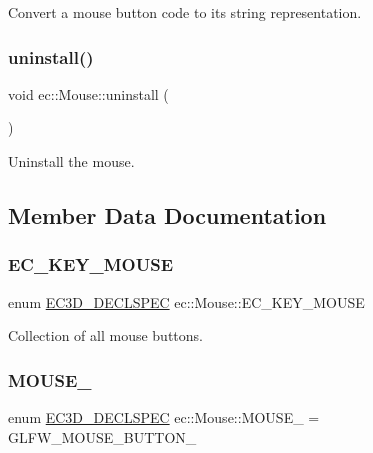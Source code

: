 Convert a mouse button code to its string representation. 

\mbox{\label{classec_1_1_mouse_afee0caa17130a35f9b94523776a6fffb}} 
\subsubsection{\texorpdfstring{uninstall()}{uninstall()}}
{\footnotesize\ttfamily void ec\+::\+Mouse\+::uninstall (\begin{DoxyParamCaption}{ }\end{DoxyParamCaption})}



Uninstall the mouse. 



\subsection{Member Data Documentation}
\mbox{\label{classec_1_1_mouse_acabdd3509adc381e415c60b29554e2fb}} 
\subsubsection{\texorpdfstring{E\+C\+\_\+\+K\+E\+Y\+\_\+\+M\+O\+U\+SE}{EC\_KEY\_MOUSE}}
{\footnotesize\ttfamily enum \mbox{\hyperlink{_common_8h_aac42573e202ca3dd4d259c81691e2369}{E\+C3\+D\+\_\+\+D\+E\+C\+L\+S\+P\+EC}} ec\+::\+Mouse\+::\+E\+C\+\_\+\+K\+E\+Y\+\_\+\+M\+O\+U\+SE}



Collection of all mouse buttons. 

\mbox{\label{classec_1_1_mouse_abc6758e2f7cbc1a68f7a06fe47658da0}} 
\subsubsection{\texorpdfstring{M\+O\+U\+S\+E\+\_}{MOUSE\_2}}
{\footnotesize\ttfamily enum \mbox{\hyperlink{_common_8h_aac42573e202ca3dd4d259c81691e2369}{E\+C3\+D\+\_\+\+D\+E\+C\+L\+S\+P\+EC}} ec\+::\+Mouse\+::\+M\+O\+U\+S\+E\+\_ = G\+L\+F\+W\+\_\+\+M\+O\+U\+S\+E\+\_\+\+B\+U\+T\+T\+O\+N\+\_}

